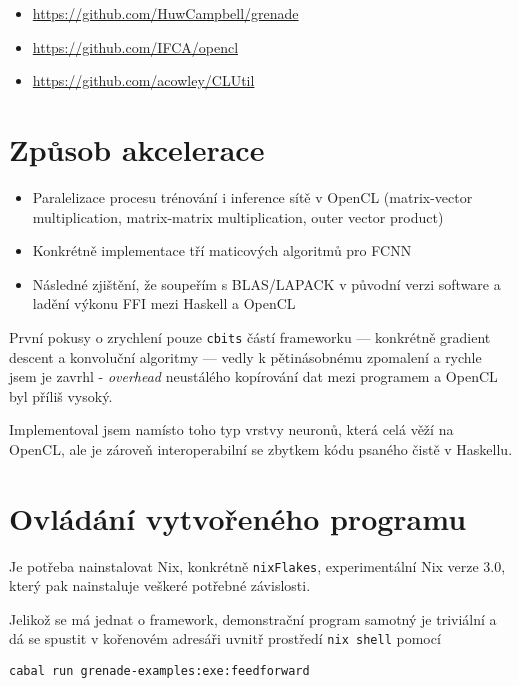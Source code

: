 \documentclass[11pt,a4paper]{article}
\begin{document}
\begin{itemize}
  \item \url{https://github.com/HuwCampbell/grenade}
  \item \url{https://github.com/IFCA/opencl}
  \item \url{https://github.com/acowley/CLUtil}
\end{itemize}

\section{Způsob akcelerace}

\begin{itemize}
  \item Paralelizace procesu trénování i inference sítě v OpenCL (matrix-vector
    multiplication, matrix-matrix multiplication, outer vector product)
  \item Konkrétně implementace tří maticových algoritmů pro FCNN
  \item Následné zjištění, že soupeřím s BLAS/LAPACK v původní verzi software a
    ladění výkonu FFI mezi Haskell a OpenCL
\end{itemize}

První pokusy o zrychlení pouze \texttt{cbits} částí frameworku --- konkrétně
gradient descent a konvoluční algoritmy --- vedly k pětinásobnému zpomalení a
rychle jsem je zavrhl - \textit{overhead} neustálého kopírování dat mezi
programem a OpenCL byl příliš vysoký.

Implementoval jsem namísto toho typ vrstvy neuronů, která celá věží na OpenCL,
ale je zároveň interoperabilní se zbytkem kódu psaného čistě v Haskellu.

\section{Ovládání vytvořeného programu}

Je potřeba nainstalovat Nix, konkrétně \texttt{nixFlakes}, experimentální Nix
verze 3.0, který pak nainstaluje veškeré potřebné závislosti.

Jelikož se má jednat o framework, demonstrační program samotný je triviální a dá
se spustit v kořenovém adresáři uvnitř prostředí \texttt{nix shell} pomocí

\begin{verbatim}
cabal run grenade-examples:exe:feedforward
\end{verbatim}
\end{document}
